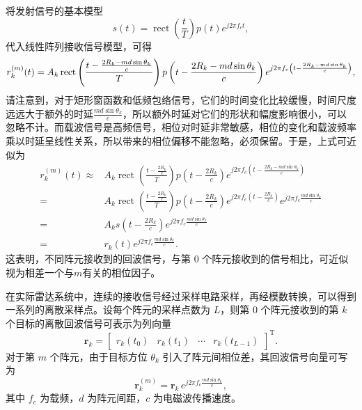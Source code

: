 将发射信号的基本模型
\[
    s(t) = \operatorname{rect}\left(\frac{t}{T}\right) p(t) e^{j 2 \pi f_c t},
\]
代入线性阵列接收信号模型，可得
\[
    \small
    r_k^{(m)}(t) = A_k \operatorname{rect}\left(\frac{t - \frac{2 R_k - m d \sin\theta_k}{c}}{T}\right)
    p\left(t - \frac{2 R_k - m d \sin\theta_k}{c}\right)
    e^{j 2 \pi f_c \left(t - \frac{2 R_k - m d \sin\theta_k}{c}\right)},
\]
请注意到，对于矩形窗函数和低频包络信号，它们的时间变化比较缓慢，时间尺度远远大于额外的时延$\frac{m d \sin\theta_k}{c}$，所以额外时延对它们的形状和幅度影响很小，可以忽略不计。而载波信号是高频信号，相位对时延非常敏感，相位的变化和载波频率乘以时延呈线性关系，所以带来的相位偏移不能忽略，必须保留。于是，上式可近似为
\[
    \begin{split}
        r_k^{(m)}(t) \approx & A_k \operatorname{rect}\left(\frac{t - \frac{2 R_k}{c}}{T}\right)
        p\left(t - \frac{2 R_k}{c}\right)
        e^{j 2 \pi f_c \left(t - \frac{2 R_k - m d \sin\theta_k}{c}\right)}                      \\
        =                    & A_k \operatorname{rect}\left(\frac{t - \frac{2 R_k}{c}}{T}\right)
        p\left(t - \frac{2 R_k}{c}\right)
        e^{j 2 \pi f_c \left(t - \frac{2 R_k}{c}\right)}
        e^{j 2 \pi f_c \frac{m d \sin\theta_k}{c}}                                               \\
        =                    & A_k s\left(t - \frac{2 R_k}{c}\right)
        e^{j 2 \pi f_c \frac{m d \sin\theta_k}{c}}                                               \\
        =                    & r_k(t) e^{j 2 \pi f_c \frac{m d \sin\theta_k}{c}}.
    \end{split}
\]
这表明，不同阵元接收到的回波信号，与第 0 个阵元接收到的信号相比，可近似视为相差一个与\( m \)有关的相位因子。

在实际雷达系统中，连续的接收信号经过采样电路采样，再经模数转换，可以得到一系列的离散采样点。设每个阵元的采样点数为 \(L\)，则第 \(0\) 个阵元接收到的第 \(k\) 个目标的离散回波信号可表示为列向量
\[
    \bm{r}_k =
    \begin{bmatrix}
        r_k(t_0) & r_k(t_1) & \cdots & r_k(t_{L-1})
    \end{bmatrix}^{\mathrm{T}}.
\]
对于第 \(m\) 个阵元，由于目标方位 \(\theta_k\) 引入了阵元间相位差，其回波信号向量可写为
\[
    \bm{r}^{(m)}_k
    = \bm{r}_k \, e^{j 2 \pi f_c \frac{m d \sin\theta_k}{c}},
\]
其中 \(f_c\) 为载频，\(d\) 为阵元间距，\(c\) 为电磁波传播速度。

